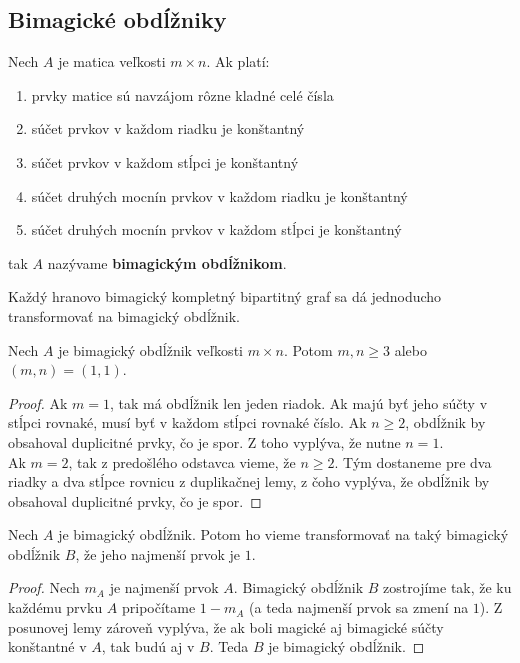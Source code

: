 \subsection{Bimagické obdĺžniky}

\begin{definition} Nech $A$ je matica veľkosti $m \times n$. Ak platí:

\begin{enumerate}
\item prvky matice sú navzájom rôzne kladné celé čísla
\item súčet prvkov v každom riadku je konštantný
\item súčet prvkov v každom stĺpci je konštantný
\item súčet druhých mocnín prvkov v každom riadku je konštantný
\item súčet druhých mocnín prvkov v každom stĺpci je konštantný
\end{enumerate}

tak $A$ nazývame \textbf{bimagickým obdĺžnikom}.
\end{definition} 

Každý hranovo bimagický kompletný bipartitný graf sa dá jednoducho transformovať na bimagický obdĺžnik. \\

\begin{theorem}
\label{rectanglemn}
Nech $A$ je bimagický obdĺžnik veľkosti $m \times n$. Potom $m,n \geq 3$ alebo $(m, n) = (1, 1)$.
\end{theorem}

\begin{proof} Ak $m = 1$, tak má obdĺžnik len jeden riadok. Ak majú byť jeho súčty v stĺpci rovnaké, musí byť v každom stĺpci rovnaké číslo. Ak $n \geq 2$, obdĺžnik by obsahoval duplicitné prvky, čo je spor. Z toho vyplýva, že nutne $n = 1$. \\

Ak $m = 2$, tak z predošlého odstavca vieme, že $n \geq 2$. Tým dostaneme pre dva riadky a dva stĺpce rovnicu z duplikačnej lemy, z čoho vyplýva, že obdĺžnik by obsahoval duplicitné prvky, čo je spor.
\end{proof}

\begin{theorem} 
\label{rectangle1}
Nech $A$ je bimagický obdĺžnik. Potom ho vieme transformovať na taký bimagický obdĺžnik $B$, že jeho najmenší prvok je $1$.
\end{theorem}

\begin{proof} Nech $m_A$ je najmenší prvok $A$. Bimagický obdĺžnik $B$ zostrojíme tak, že ku každému prvku $A$ pripočítame $1 - m_A$ (a teda najmenší prvok sa zmení na $1$). Z posunovej lemy zároveň vyplýva, že ak boli magické aj bimagické súčty konštantné v $A$, tak budú aj v $B$. Teda $B$ je bimagický obdĺžnik.
\end{proof}

